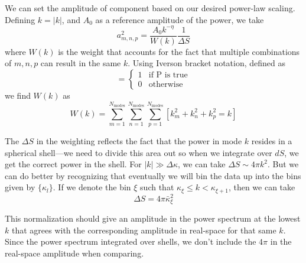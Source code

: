 \documentclass[11pt]{article}
\begin{document}
We can set the amplitude of component based on our desired
power-law scaling.  Defining $k = |k|$, and $A_0$ as a
reference amplitude of the power, we take
\begin{equation}
a_{m,n,p}^2 = \frac{A_0 k^{-\eta}}{W(k)} \frac{1}{\Delta S}
\end{equation}
where $W(k)$ is the weight that accounts for the fact that multiple
combinations of $m, n, p$ can result in the same $k$.  Using Iverson bracket
notation, defined as
\begin{equation}
[P] = \begin{cases}
  1 & \text{if P is true} \\
  0 & \text{otherwise}
      \end{cases}
\end{equation}
we find $W(k)$ as
\begin{equation}
W(k) = \sum_{m=1}^{N_\mathrm{modes}}
       \sum_{n=1}^{N_\mathrm{modes}} 
       \sum_{p=1}^{N_\mathrm{modes}} [ k_m^2 + k_n^2 + k_p^2 = k ]
\end{equation}

The $\Delta S$ in the weighting reflects the fact that the power 
in mode $k$ resides in a spherical shell---we need to divide this
area out so when we integrate over $dS$, we get the correct power
in the shell.  For $|k| \gg \Delta \kappa$, we can take $\Delta S \sim
4\pi k^2$.  But we can do better by recognizing that eventually we
will bin the data up into the bins given by $\{\kappa_l\}$.  If we
denote the bin $\xi$ such that $\kappa_\xi \le k < \kappa_{\xi+1}$,
then we can take
\begin{equation}
\Delta S = 4 \pi \bar{\kappa}_\xi^2
\end{equation}

This normalization should give an amplitude in the power spectrum at the lowest
$k$ that agrees with the corresponding amplitude in real-space for that same $k$.  
Since the power spectrum integrated over shells, we don't include the $4\pi$
in the real-space amplitude when comparing.
\end{document}
